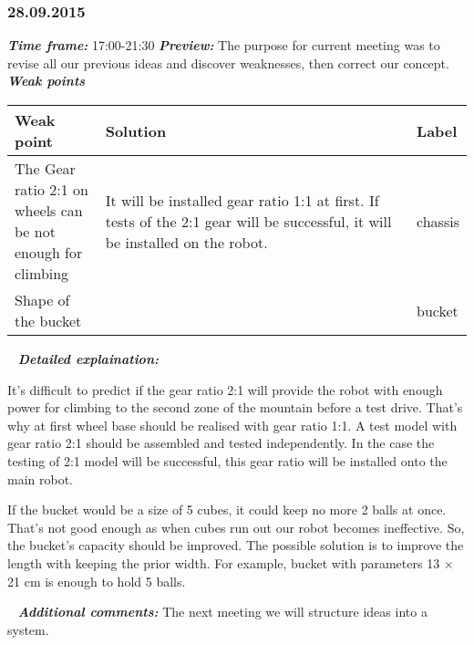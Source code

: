 \subsubsection{28.09.2015}
	\textit{\textbf{Time frame:}} 17:00-21:30 \newline
	\textit{\textbf{Preview:}} The purpose for current meeting was to revise all our previous ideas and discover weaknesses, then correct our concept.\newline \newline
	\textit{\textbf{Weak points}}

  \begin{table}[H]
	\vspace{-2mm}
	\begin{center}
		\begin{tabular}{|p{0.2\linewidth}|p{0.7\linewidth}|p{0.1\linewidth}|}
			\hline
			Weak point & Solution & Label \\
			\hline
			The Gear ratio 2:1 on wheels can be not enough for climbing & It will be installed gear ratio 1:1 at first. If tests of the 2:1 gear will be successful, it will be installed on the robot. & chassis \\
			\hline
			Shape of the bucket &  & bucket \\
			\hline
		\end{tabular}
	\end{center}
  \end{table}
  
   \newline
  \textit{\textbf{Detailed explaination:}}
  \begin{enumerate*}
  	\item It's difficult to predict if the gear ratio 2:1 will provide the robot with enough power for climbing to the second zone of the mountain before a test drive. That's why at first wheel base should be realised with gear ratio 1:1. A test model with gear ratio 2:1 should be assembled and tested independently. In the case the testing of 2:1 model will be successful, this gear ratio will be installed onto the main robot.
  	
  	
  	\item If the bucket would be a size of 5 cubes, it could keep no more 2 balls at once. That's not good enough as when cubes run out our robot becomes ineffective. So, the bucket's capacity should be improved. The possible solution is to improve the length with keeping the prior width. For example, bucket with parameters 13 $\times$ 21 cm is enough to hold 5 balls.
  	
  \end{enumerate*}
  
   \newline
  \textit{\textbf{Additional comments:}} The next meeting we will structure ideas into a system.
  
\fillpage
